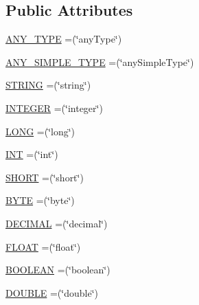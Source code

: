 \subsection*{Public Attributes}
\begin{DoxyCompactItemize}
\item 
\hyperlink{enumorg_1_1semanticweb_1_1owlapi_1_1vocab_1_1_x_s_d_vocabulary_a5104c709bb3de0fbe65061f58184da30}{A\-N\-Y\-\_\-\-T\-Y\-P\-E} =(\char`\"{}any\-Type\char`\"{})
\item 
\hyperlink{enumorg_1_1semanticweb_1_1owlapi_1_1vocab_1_1_x_s_d_vocabulary_a99fa1b703e407332b0323ccdd34bbe39}{A\-N\-Y\-\_\-\-S\-I\-M\-P\-L\-E\-\_\-\-T\-Y\-P\-E} =(\char`\"{}any\-Simple\-Type\char`\"{})
\item 
\hyperlink{enumorg_1_1semanticweb_1_1owlapi_1_1vocab_1_1_x_s_d_vocabulary_ab4241d39a9fd8a5b8e548a7254033cf4}{S\-T\-R\-I\-N\-G} =(\char`\"{}string\char`\"{})
\item 
\hyperlink{enumorg_1_1semanticweb_1_1owlapi_1_1vocab_1_1_x_s_d_vocabulary_a5832ea5dd54356a15a6146491737a68b}{I\-N\-T\-E\-G\-E\-R} =(\char`\"{}integer\char`\"{})
\item 
\hyperlink{enumorg_1_1semanticweb_1_1owlapi_1_1vocab_1_1_x_s_d_vocabulary_a63a144674faaedc0c4b6938ecb4ff333}{L\-O\-N\-G} =(\char`\"{}long\char`\"{})
\item 
\hyperlink{enumorg_1_1semanticweb_1_1owlapi_1_1vocab_1_1_x_s_d_vocabulary_a6cb1424fc8dc2f0bacf1d96ad9c3aa28}{I\-N\-T} =(\char`\"{}int\char`\"{})
\item 
\hyperlink{enumorg_1_1semanticweb_1_1owlapi_1_1vocab_1_1_x_s_d_vocabulary_a8ad9a3bcadf0f795d0990cac28fbf8e5}{S\-H\-O\-R\-T} =(\char`\"{}short\char`\"{})
\item 
\hyperlink{enumorg_1_1semanticweb_1_1owlapi_1_1vocab_1_1_x_s_d_vocabulary_ae3a43536c3873d1ad2bf284a60b4625d}{B\-Y\-T\-E} =(\char`\"{}byte\char`\"{})
\item 
\hyperlink{enumorg_1_1semanticweb_1_1owlapi_1_1vocab_1_1_x_s_d_vocabulary_a47718a7834afe795fe710a3634918915}{D\-E\-C\-I\-M\-A\-L} =(\char`\"{}decimal\char`\"{})
\item 
\hyperlink{enumorg_1_1semanticweb_1_1owlapi_1_1vocab_1_1_x_s_d_vocabulary_a7422ae061358457650d2897e5fd927fa}{F\-L\-O\-A\-T} =(\char`\"{}float\char`\"{})
\item 
\hyperlink{enumorg_1_1semanticweb_1_1owlapi_1_1vocab_1_1_x_s_d_vocabulary_ae84ffc3484f4d2caabea9415578ceb34}{B\-O\-O\-L\-E\-A\-N} =(\char`\"{}boolean\char`\"{})
\item 
\hyperlink{enumorg_1_1semanticweb_1_1owlapi_1_1vocab_1_1_x_s_d_vocabulary_ae0e78eb93a310479b8ad3a34a492b348}{D\-O\-U\-B\-L\-E} =(\char`\"{}double\char`\"{})

\end{DoxyCompactItemize}
